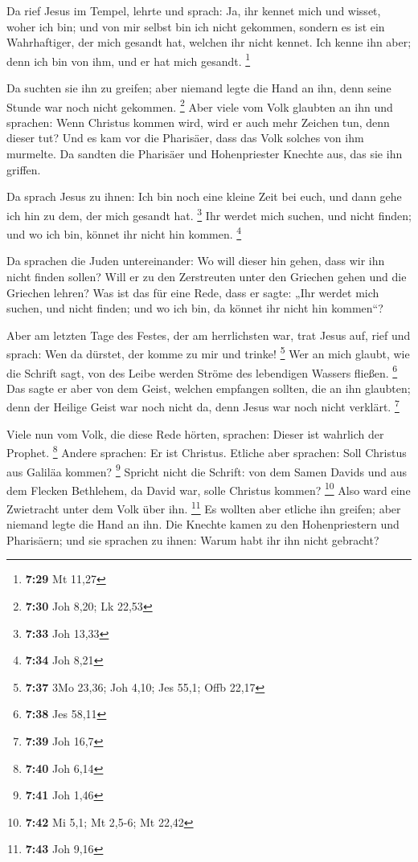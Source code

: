  Da rief Jesus im Tempel, lehrte und sprach: Ja, ihr kennet
mich und wisset, woher ich bin; und von mir selbst bin ich nicht
gekommen, sondern es ist ein Wahrhaftiger, der mich gesandt hat, welchen
ihr nicht kennet.  Ich kenne ihn aber; denn ich bin von
ihm, und er hat mich gesandt. \footnote{\textbf{7:29} Mt 11,27}

 Da suchten sie ihn zu greifen; aber niemand legte die Hand
an ihn, denn seine Stunde war noch nicht gekommen. \footnote{\textbf{7:30}
  Joh 8,20; Lk 22,53}  Aber viele vom Volk glaubten an ihn
und sprachen: Wenn Christus kommen wird, wird er auch mehr Zeichen tun,
denn dieser tut?  Und es kam vor die Pharisäer, dass das
Volk solches von ihm murmelte. Da sandten die Pharisäer und
Hohenpriester Knechte aus, das sie ihn griffen.

 Da sprach Jesus zu ihnen: Ich bin noch eine kleine Zeit
bei euch, und dann gehe ich hin zu dem, der mich gesandt hat.
\footnote{\textbf{7:33} Joh 13,33}  Ihr werdet mich suchen,
und nicht finden; und wo ich bin, könnet ihr nicht hin kommen.
\footnote{\textbf{7:34} Joh 8,21}

 Da sprachen die Juden untereinander: Wo will dieser hin
gehen, dass wir ihn nicht finden sollen? Will er zu den Zerstreuten
unter den Griechen gehen und die Griechen lehren?  Was ist
das für eine Rede, dass er sagte: „Ihr werdet mich suchen, und nicht
finden; und wo ich bin, da könnet ihr nicht hin kommen``?

 Aber am letzten Tage des Festes, der am herrlichsten war,
trat Jesus auf, rief und sprach: Wen da dürstet, der komme zu mir und
trinke! \footnote{\textbf{7:37} 3Mo 23,36; Joh 4,10; Jes 55,1; Offb
  22,17}  Wer an mich glaubt, wie die Schrift sagt, von des
Leibe werden Ströme des lebendigen Wassers fließen. \footnote{\textbf{7:38}
  Jes 58,11}  Das sagte er aber von dem Geist, welchen
empfangen sollten, die an ihn glaubten; denn der Heilige Geist war noch
nicht da, denn Jesus war noch nicht verklärt. \footnote{\textbf{7:39}
  Joh 16,7}

 Viele nun vom Volk, die diese Rede hörten, sprachen:
Dieser ist wahrlich der Prophet. \footnote{\textbf{7:40} Joh 6,14}
 Andere sprachen: Er ist Christus. Etliche aber sprachen:
Soll Christus aus Galiläa kommen? \footnote{\textbf{7:41} Joh 1,46}
 Spricht nicht die Schrift: von dem Samen Davids und aus
dem Flecken Bethlehem, da David war, solle Christus kommen? \footnote{\textbf{7:42}
  Mi 5,1; Mt 2,5-6; Mt 22,42}  Also ward eine Zwietracht
unter dem Volk über ihn. \footnote{\textbf{7:43} Joh 9,16} 
Es wollten aber etliche ihn greifen; aber niemand legte die Hand an ihn.
 Die Knechte kamen zu den Hohenpriestern und Pharisäern;
und sie sprachen zu ihnen: Warum habt ihr ihn nicht gebracht?

